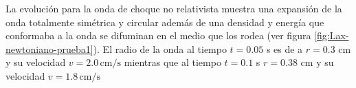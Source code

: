 \documentclass[12pt,a4paper]{book}
\begin{document}
La evolución para la onda de choque no relativista muestra una expansión de la onda totalmente simétrica y circular además de una densidad y energía que conformaba a la onda se difuminan en el medio que los rodea (ver figura \ref{fig:Lax-newtoniano-prueba1}). El radio de la onda al tiempo $ t =0.05$ s es de a $r = 0.3 $ cm y su velocidad $v = 2.0 \, \mathrm{cm}/\mathrm{s}$ mientras que al tiempo $t=0.1$ s $r = 0.38$ cm y su velocidad $v = 1.8 \, \mathrm{cm}/\mathrm{s}$


\begin{figure}[H]
\centering
{}

\end{figure}
\end{document}
